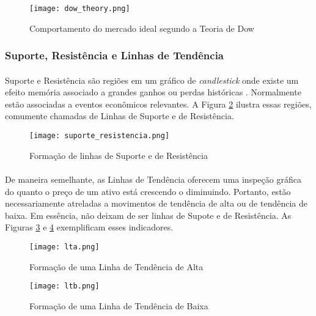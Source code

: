 \begin{figure}[!htb]
    \texttt{[image: dow\_theory.png]}
    \centering
    \caption{Comportamento do mercado ideal segundo a Teoria de Dow \cite{kirkpatrick2010technical}}
    \label{fig:2}
\end{figure}



\FloatBarrier
\subsubsection*{Suporte, Resistência e Linhas de Tendência}

\paragraph{} Suporte e Resistência são regiões em um gráfico de \textit{candlestick} onde existe um efeito memória associado a grandes ganhos ou perdas históricas \cite{moraes2007se}. Normalmente estão associadas a eventos econômicos relevantes. A Figura \ref{fig:3} ilustra essas regiões, comumente chamadas de Linhas de Suporte e de Resistência.

\begin{figure}[!htb]
    \texttt{[image: suporte\_resistencia.png]}
    \centering
    \caption{Formação de linhas de Suporte e de Resistência \cite{moraes2007se}}
    \label{fig:3}
\end{figure}

\paragraph{} De maneira semelhante, as Linhas de Tendência oferecem uma inspeção gráfica do quanto o preço de um ativo está crescendo o diminuindo. Portanto, estão necessariamente atreladas a movimentos de tendência de alta ou de tendência de baixa. Em essência, não deixam de ser linhas de Supote e de Resistência. As Figuras \ref{fig:4} e \ref{fig:5} exemplificam esses indicadores.

\begin{figure}[!htb]
    \texttt{[image: lta.png]}
    \centering
    \caption{Formação de uma Linha de Tendência de Alta \cite{moraes2007se}}
    \label{fig:4}
\end{figure}

\begin{figure}[!htb]
    \texttt{[image: ltb.png]}
    \centering
    \caption{Formação de uma Linha de Tendência de Baixa \cite{moraes2007se}}
    \label{fig:5}
\end{figure}



